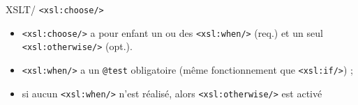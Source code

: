\documentclass{beamer}
\begin{document}
    \begin{frame}{XSLT/ \texttt{<xsl:choose/>}}
        \Large
        \begin{itemize}
            \item \texttt{<xsl:choose/>} a pour enfant un ou des \texttt{<xsl:when/>} (req.) et un seul \texttt{<xsl:otherwise/>} (opt.).
            \bigskip
            \item \texttt{<xsl:when/>} a un \texttt{@test} obligatoire (même fonctionnement que \texttt{<xsl:if/>}) ;
            \bigskip
            \item si aucun \texttt{<xsl:when/>} n'est réalisé, alors \texttt{<xsl:otherwise/>} est activé
        \end{itemize}
    \end{frame}
\end{document}
